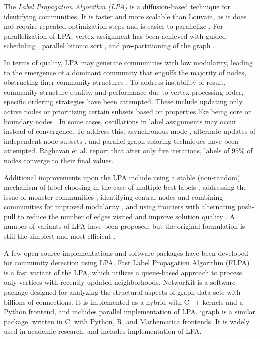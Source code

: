 The \textit{Label Propagation Algorithm (LPA)} is a diffusion-based technique for identifying communities. It is faster and more scalable than Louvain, as it does not require repeated optimization steps and is easier to parallelize \cite{com-newman04, com-raghavan07}. For parallelization of LPA, vertex assignment has been achieved with guided scheduling \cite{staudt2015engineering}, parallel bitonic sort \cite{soman2011fast}, and pre-partitioning of the graph \cite{kuzmin2015parallelizing}.

In terms of quality, LPA may generate communities with low modularity, leading to the emergence of a dominant community that engulfs the majority of nodes, obstructing finer community structures \cite{com-gregory10}. To address instability of result, community structure quality, and performance due to vertex processing order, specific ordering strategies have been attempted. These include updating only active nodes \cite{xie2011community} or prioritizing certain subsets based on properties like being core or boundary nodes \cite{gui2018community}. In some cases, oscillations in label assignments may occur instead of convergence. To address this, asynchronous mode \cite{leung2009towards}, alternate updates of independent node subsets \cite{cordasco2012label}, and parallel graph coloring techniques \cite{cordasco2012label} have been attempted. Raghavan et al. \cite{com-raghavan07} report that after only five iterations, labels of $95\%$ of nodes converge to their final values.

Additional improvements upon the LPA include using a stable (non-random) mechanism of label choosing in the case of multiple best labels \cite{com-xing14}, addressing the issue of monster communities \cite{com-berahmand18, com-sattari18}, identifying central nodes and combining communities for improved modularity \cite{com-you20}, and using frontiers with alternating push-pull to reduce the number of edges visited and improve solution quality \cite{com-liu20}. A number of variants of LPA have been proposed, but the original formulation is still the simplest and most efficient \cite{garza2019community}.

A few open source implementations and software packages have been developed for community detection using LPA. Fast Label Propagation Algorithm (FLPA) \cite{traag2023large} is a fast variant of the LPA, which utilizes a queue-based approach to process only vertices with recently updated neighborhoods. NetworKit \cite{staudt2016networkit} is a software package designed for analyzing the structural aspects of graph data sets with billions of connections. It is implemented as a hybrid with C++ kernels and a Python frontend, and includes parallel implementation of LPA. igraph \cite{csardi2006igraph} is a similar package, written in C, with Python, R, and Mathematica frontends. It is widely used in academic research, and includes implementation of LPA.






